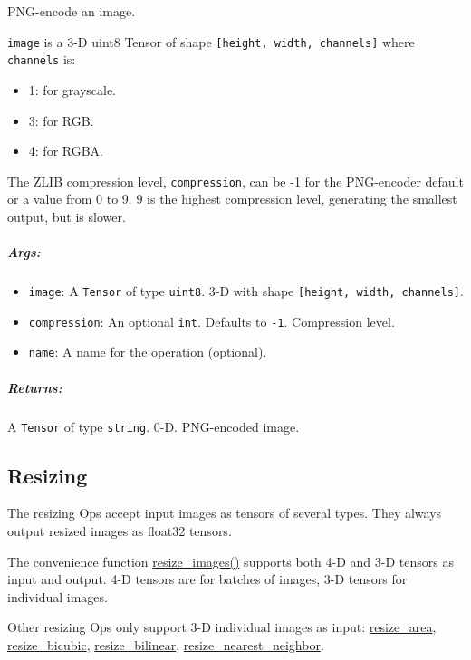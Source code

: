 PNG-encode an image.

\texttt{image} is a 3-D uint8 Tensor of shape
\texttt{{[}height,\ width,\ channels{]}} where \texttt{channels} is:

\begin{itemize}
\tightlist
\item
  1: for grayscale.
\item
  3: for RGB.
\item
  4: for RGBA.
\end{itemize}

The ZLIB compression level, \texttt{compression}, can be -1 for the
PNG-encoder default or a value from 0 to 9. 9 is the highest compression
level, generating the smallest output, but is slower.

\subparagraph{Args: }\label{args-3}

\begin{itemize}
\tightlist
\item
  \texttt{image}: A \texttt{Tensor} of type \texttt{uint8}. 3-D with
  shape \texttt{{[}height,\ width,\ channels{]}}.
\item
  \texttt{compression}: An optional \texttt{int}. Defaults to
  \texttt{-1}. Compression level.
\item
  \texttt{name}: A name for the operation (optional).
\end{itemize}

\subparagraph{Returns: }\label{returns-3}

A \texttt{Tensor} of type \texttt{string}. 0-D. PNG-encoded image.

\subsection{Resizing }\label{resizing}

The resizing Ops accept input images as tensors of several types. They
always output resized images as float32 tensors.

The convenience function
\protect\hyperlink{resizeux5fimages}{resize\_images()} supports both 4-D
and 3-D tensors as input and output. 4-D tensors are for batches of
images, 3-D tensors for individual images.

Other resizing Ops only support 3-D individual images as input:
\protect\hyperlink{resizeux5farea}{resize\_area},
\protect\hyperlink{resizeux5fbicubic}{resize\_bicubic},
\protect\hyperlink{resizeux5fbilinear}{resize\_bilinear},
\protect\hyperlink{resizeux5fnearestux5fneighbor}{resize\_nearest\_neighbor}.

